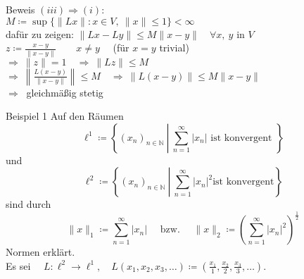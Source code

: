 \documentclass[AERbeamer%
,optBeamerClassicFormat%
,optLeftEquations   %
]{AERlatex}
\begin{document}
%
    \begin{frame}{Beweis}
        \setlength{\baselineskip}{1.6\baselineskip}
%
        $(iii) \Rightarrow (i)$: \\ \pause
        $M\coloneqq\sup \{\|L x\|: x \in V,~\|x\| \leq 1\}<\infty$ \\ \pause
        dafür zu zeigen: $\|L x-L y\| \leq M\|x-y\| \quad \forall x, ~ y \text{ in } V$ \\ \pause
        $z\coloneqq\frac{x-y}{\|x-y\|} \qquad x \neq y \quad$ (für $x=y$ trivial) \\ \pause
        $\Rightarrow ~\|z\|=1 \quad \Rightarrow ~\|L z\| \leq M$ \\ \pause
        $\Rightarrow ~\left\|\frac{L(x-y)}{\|x-y\|}\right\| \leq M \quad \Rightarrow ~\|L(x-y)\| \leq M\|x-y\|$ \\ \pause
        $\Rightarrow ~$ gleichmäßig stetig
    \end{frame}
%
%
    \begin{frame}{Beispiel 1}
        \setlength{\baselineskip}{1.3\baselineskip}
        Auf den Räumen
        \begin{equation*}
            \ell^1\coloneqq \left\{\left(x_n\right)_{n \in \mathbb{N}} ~ \left| ~ \sum_{n=1}^{\infty} \right. |x_n| \text { ist konvergent }\right\}
        \end{equation*}
        und
        \begin{equation*}
            \ell^2\coloneqq \left\{\left(x_n\right)_{n \in \mathbb{N}} ~ \left| ~ \sum_{n=1}^{\infty} \right. \left|x_n\right|^2 \text{ist konvergent} \right\}
        \end{equation*}
        sind durch
        \begin{equation*}
            \|x\|_1\coloneqq\sum_{n=1}^{\infty}\left|x_n\right| \quad \text { bzw. } \quad\|x\|_2\coloneqq\left(\sum_{n=1}^{\infty}\left|x_n\right|^2\right)^{\frac{1}{2}}
        \end{equation*}
        Normen erklärt. \\
        Es sei $\quad L: \ell^2 \rightarrow \ell^1, \quad L\left(x_1, x_2, x_3, \ldots\right)\coloneqq\left(\frac{x_1}{1}, \frac{x_2}{2}, \frac{x_3}{3}, \ldots\right)$.
    \end{frame}
%
\end{document}
